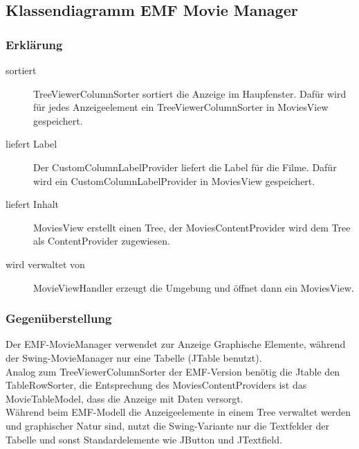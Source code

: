 \documentclass[ngerman]{scrartcl}
\title{\mytitle}
\author{\myauthor}
\newcommand{\blattnummer}{9}												%
\newcommand{\aufgabe}{1}
\begin{document}
	\setcounter{section}{\blattnummer}
	\setcounter{subsection}{\aufgabe-1}
	\subsection{Klassendiagramm EMF Movie Manager}
	\setcounter{subsubsection}{3}
	\subsubsection{Erklärung}

	\begin{description}
	\item [sortiert] TreeViewerColumnSorter sortiert die Anzeige im Haupfenster. Dafür wird für jedes Anzeigeelement ein TreeViewerColumnSorter in MoviesView gespeichert.
	\item [liefert Label] Der CustomColumnLabelProvider liefert die Label für die Filme. Dafür wird ein CustomColumnLabelProvider in MoviesView gespeichert.
	\item [liefert Inhalt] MoviesView erstellt einen Tree, der MoviesContentProvider wird dem Tree als ContentProvider zugewiesen.
	\item [wird verwaltet von] MovieViewHandler erzeugt die Umgebung und öffnet dann ein MoviesView.
	\end{description}

	\setcounter{subsubsection}{5}
	\subsubsection{Gegenüberstellung}
	Der EMF-MovieManager verwendet zur Anzeige Graphische Elemente, während der Swing-MovieManager nur eine Tabelle (JTable benutzt).\\
	Analog zum TreeViewerColumnSorter der EMF-Version benötig die Jtable den TableRowSorter, die Entsprechung des MoviesContentProviders ist das MovieTableModel, dass die Anzeige mit Daten versorgt.\\
	Während beim EMF-Modell die Anzeigeelemente in einem Tree verwaltet werden und graphischer Natur sind, nutzt die Swing-Variante nur die Textfelder der Tabelle und sonst Standardelemente wie JButton und JTextfield.
\end{document}
